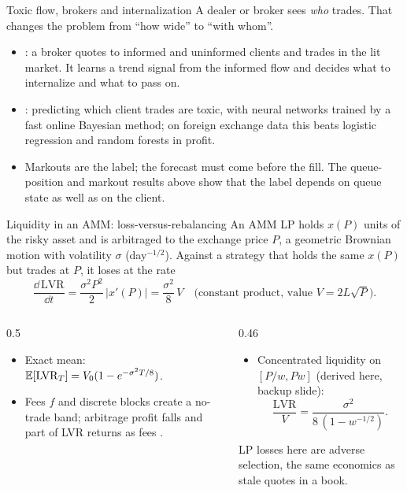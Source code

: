\begin{frame}{Toxic flow, brokers and internalization}
  \small
  A dealer or broker sees \emph{who} trades. That changes the problem from ``how wide'' to ``with whom''.
  \begin{itemize}
    \item \citet{cartea2025brokers}: a broker quotes to informed and uninformed clients and trades in the lit market. It learns a trend signal from the informed flow and decides what to internalize and what to pass on.
    \item \citet{cartea2023detecting}: predicting which client trades are toxic, with neural networks trained by a fast online Bayesian method; on foreign exchange data this beats logistic regression and random forests in profit.
    \item Markouts are the label; the forecast must come before the fill. The queue-position and markout results above show that the label depends on queue state as well as on the client.
  \end{itemize}
\end{frame}

\begin{frame}{Liquidity in an AMM: loss-versus-rebalancing}
  \small
  An AMM LP holds $x(P)$ units of the risky asset and is arbitraged to the exchange price $P$, a geometric Brownian motion with volatility $\sigma$ (day$^{-1/2}$). Against a strategy that holds the same $x(P)$ but trades at $P$, it loses at the rate \citep{milionis2022automated}
  \[ \frac{\dd\,\mathrm{LVR}}{\dd t} = \frac{\sigma^2P^2}{2}\,|x'(P)| = \frac{\sigma^2}{8}\,V \quad \text{(constant product, value } V = 2L\sqrt P). \]
  \begin{columns}[T]
    \begin{column}{0.5\textwidth}
      \begin{itemize}
        \item Exact mean: $\mathbb{E}[\mathrm{LVR}_T] = V_0(1 - e^{-\sigma^2 T/8})$.
        \item Fees $f$ and discrete blocks create a no-trade band; arbitrage profit falls and part of LVR returns as fees \citep{milionis2023fees}.
      \end{itemize}
    \end{column}
    \begin{column}{0.46\textwidth}
      \begin{itemize}
        \item Concentrated liquidity on $[P/w, Pw]$ (derived here, backup slide):
        \[ \frac{\mathrm{LVR}}{V} = \frac{\sigma^2}{8\,(1 - w^{-1/2})}. \]
      \end{itemize}
      LP losses here are adverse selection, the same economics as stale quotes in a book.
    \end{column}
  \end{columns}
\end{frame}

